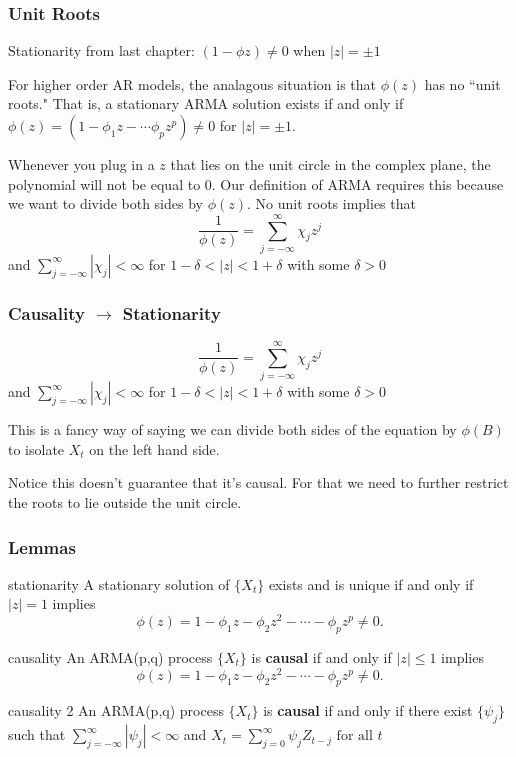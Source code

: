 \documentclass{beamer}
\begin{document}
\begin{frame}
\frametitle{Unit Roots}

Stationarity from last chapter: $(1 - \phi z) \neq 0$ when $|z| = \pm 1$
\newline

For higher order AR models, the analagous situation is that $\phi(z)$ has no ``unit roots." That is, a stationary ARMA solution exists if and only if $\phi(z) = (1 - \phi_1 z - \cdots \phi_p z^p) \neq 0$ for $|z| = \pm 1$. 
\newline

Whenever you plug in a $z$ that lies on the unit circle in the complex plane, the polynomial will not be equal to $0$. Our definition of ARMA requires this because we want to divide both sides by $\phi(z)$. No unit roots implies that 
\[
\frac{1}{\phi(z)} = \sum_{j=-\infty}^{\infty}\chi_j z^j
\]
and $\sum_{j=-\infty}^{\infty}|\chi_j| < \infty$ for $1 - \delta < |z| < 1 + \delta$ with some $\delta > 0$ 

\end{frame}


\begin{frame}
\frametitle{Causality $\to$ Stationarity }

\[
\frac{1}{\phi(z)} = \sum_{j=-\infty}^{\infty}\chi_j z^j
\]
and $\sum_{j=-\infty}^{\infty}|\chi_j| < \infty$ for $1 - \delta < |z| < 1 + \delta$ with some $\delta > 0$
\newline

This is a fancy way of saying we can divide both sides of the equation by $\phi(B)$ to isolate $X_t$ on the left hand side.
\newline

Notice this doesn't guarantee that it's causal. For that we need to further restrict the roots to lie outside the unit circle. 

\end{frame}


\begin{frame}
\frametitle{Lemmas}
\begin{block}{stationarity}
A stationary solution of $\{X_t\}$ exists and is unique if and only if $|z| = 1$ implies
\[
\phi(z) = 1 - \phi_1 z - \phi_2 z^2 - \cdots - \phi_pz^p \neq 0.
\]
\end{block}

\begin{block}{causality}
An ARMA(p,q) process $\{X_t\}$ is {\bf causal} if and only if $|z| \le 1$ implies
\[
\phi(z) = 1 - \phi_1 z - \phi_2 z^2 - \cdots - \phi_pz^p \neq 0.
\]
\end{block}
\begin{block}{causality 2}
An ARMA(p,q) process $\{X_t\}$ is {\bf causal} if and only if there exist $\{\psi_j\}$ such that $\sum_{j=-\infty}^{\infty}|\psi_j| < \infty$ and $X_t = \sum_{j=0}^{\infty} \psi_j Z_{t-j} \text{ for all $t$}$
\end{block}


\end{frame}
\end{document}
